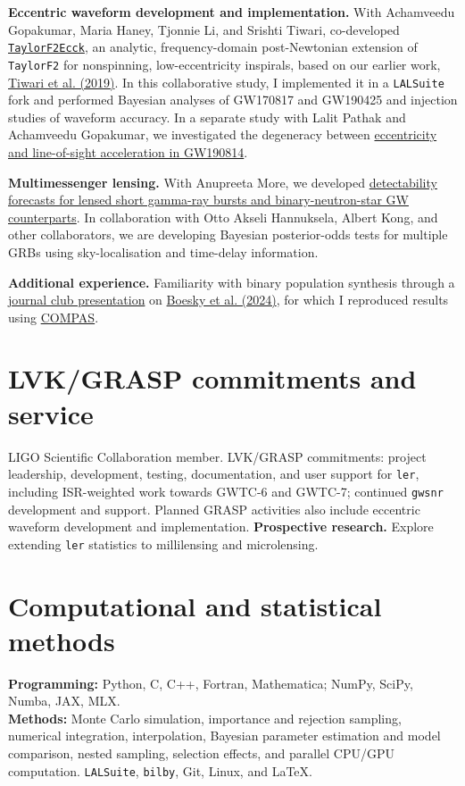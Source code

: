 \documentclass[11pt]{article}
\begin{document}
\textbf{Eccentric waveform development and implementation.} With Achamveedu Gopakumar, Maria Haney, Tjonnie Li, and Srishti Tiwari, co-developed \href{https://arxiv.org/abs/2508.12697}{\texttt{TaylorF2Ecck}}, an analytic, frequency-domain post-Newtonian extension of \texttt{TaylorF2} for nonspinning, low-eccentricity inspirals, based on our earlier work, \href{https://arxiv.org/abs/1905.07956}{Tiwari et al. (2019)}. In this collaborative study, I implemented it in a \texttt{LALSuite} fork and performed Bayesian analyses of GW170817 and GW190425 and injection studies of waveform accuracy. In a separate study with Lalit Pathak and Achamveedu Gopakumar, we investigated the degeneracy between \href{https://arxiv.org/abs/2605.21955}{eccentricity and line-of-sight acceleration in GW190814}.

\textbf{Multimessenger lensing.} With Anupreeta More, we developed \href{https://arxiv.org/abs/2502.02536}{detectability forecasts for lensed short gamma-ray bursts and binary-neutron-star GW counterparts}. In collaboration with Otto Akseli Hannuksela, Albert Kong, and other collaborators, we are developing Bayesian posterior-odds tests for multiple GRBs using sky-localisation and time-delay information.

\textbf{Additional experience.} Familiarity with binary population synthesis through a \href{https://docs.google.com/presentation/d/1WBn-nu949xdn9oGZe1GgIlbHsQ_ZBelahJA6aSFyVq0/edit}{journal club presentation} on \href{https://arxiv.org/abs/2405.01623}{Boesky et al. (2024)}, for which I reproduced results using \href{https://compas.science/}{COMPAS}.
\section*{LVK/GRASP commitments and service}
LIGO Scientific Collaboration member. LVK/GRASP commitments: project leadership, development, testing, documentation, and user support for \texttt{ler}, including ISR-weighted work towards GWTC-6 and GWTC-7; continued \texttt{gwsnr} development and support. Planned GRASP activities also include eccentric waveform development and implementation.
\newpage
\textbf{Prospective research.} Explore extending \texttt{ler} statistics to millilensing and microlensing.
\section*{Computational and statistical methods}
\textbf{Programming:} Python, C, C++, Fortran, Mathematica; NumPy, SciPy, Numba, JAX, MLX.\\
\textbf{Methods:} Monte Carlo simulation, importance and rejection sampling, numerical integration, interpolation, Bayesian parameter estimation and model comparison, nested sampling, selection effects, and parallel CPU/GPU computation. \texttt{LALSuite}, \texttt{bilby}, Git, Linux, and \LaTeX.
\end{document}
